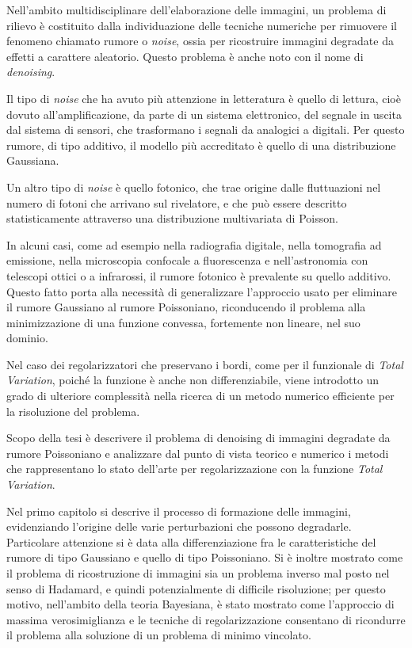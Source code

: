 Nell'ambito multidisciplinare dell'elaborazione delle immagini, un problema di rilievo \`{e} costituito dalla individuazione delle tecniche numeriche per rimuovere il fenomeno chiamato rumore o \emph{noise}, ossia per ricostruire immagini degradate da effetti a carattere aleatorio. Questo problema \`{e} anche noto con il nome di \emph{denoising}.

Il tipo di \emph{noise} che ha avuto pi\`{u} attenzione in letteratura \`{e} quello di lettura, cio\`{e} dovuto all'amplificazione, da parte di un sistema elettronico, del segnale in uscita dal sistema di sensori, che trasformano i segnali da analogici a digitali. Per questo rumore, di tipo additivo, il modello pi\`{u} accreditato \`{e} quello di una distribuzione Gaussiana.

Un altro tipo di \emph{noise} \`{e} quello fotonico, che trae origine dalle fluttuazioni nel numero di fotoni che arrivano sul rivelatore, e che pu\`{o} essere descritto statisticamente attraverso una distribuzione multivariata di Poisson.

In alcuni casi, come ad esempio nella radiografia digitale, nella tomografia ad emissione, nella microscopia confocale a fluorescenza e nell'astronomia con telescopi ottici o a infrarossi, il rumore fotonico \`{e} prevalente su quello additivo. Questo fatto porta alla necessit\`{a} di generalizzare l'approccio usato per eliminare il rumore Gaussiano al rumore Poissoniano, riconducendo il problema alla minimizzazione di una funzione convessa, fortemente non lineare, nel suo dominio.

Nel caso dei regolarizzatori che preservano i bordi, come per il funzionale di \emph{Total Variation}, poich\'{e} la funzione \`{e} anche non differenziabile, viene introdotto un grado di ulteriore complessit\`{a} nella ricerca di un metodo numerico efficiente per la risoluzione del problema.

Scopo della tesi \`{e} descrivere il problema di denoising di immagini degradate da rumore Poissoniano e analizzare dal punto di vista teorico e numerico i metodi che rappresentano lo stato dell'arte per regolarizzazione con la funzione \emph{Total Variation}.

Nel primo capitolo si descrive il processo di formazione delle immagini, evidenziando l'origine delle varie perturbazioni che possono degradarle. Particolare attenzione si \`{e} data alla differenziazione fra le caratteristiche del rumore di tipo Gaussiano e quello di tipo Poissoniano.  Si \`{e} inoltre mostrato come il problema di ricostruzione di immagini sia un problema inverso mal posto nel senso di Hadamard, e quindi potenzialmente di difficile risoluzione; per questo motivo, nell'ambito della teoria Bayesiana, \`{e} stato mostrato come l'approccio di massima verosimiglianza e le tecniche di regolarizzazione consentano di ricondurre il problema alla soluzione di un problema di minimo vincolato.

